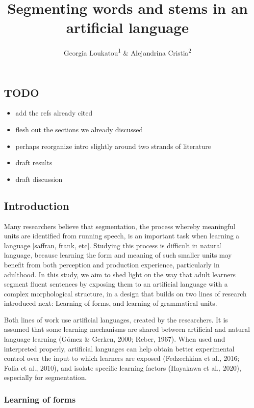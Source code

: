 \documentclass[
  american,
  ,man,floatsintext]{apa6}
\title{Segmenting words and stems in an artificial language}
\author{Georgia Loukatou\textsuperscript{1} \& Alejandrina Cristia\textsuperscript{2}}
\date{}
\affiliation{\vspace{0.5cm}\textsuperscript{1} Stanford University\\\textsuperscript{2} Laboratoire de Sciences Cognitives et de Psycholinguistique, Département d'Etudes Cognitives, ENS, EHESS, CNRS, PSL University}
\providecommand{\tightlist}{%
  \setlength{\itemsep}{0pt}\setlength{\parskip}{0pt}}
\begin{document}
\maketitle

\hypertarget{todo}{%
\subsection{TODO}\label{todo}}

\begin{itemize}
\tightlist
\item
  add the refs already cited
\item
  flesh out the sections we already discussed
\item
  perhaps reorganize intro slightly around two strands of literature
\item
  draft results
\item
  draft discussion
\end{itemize}

\hypertarget{introduction}{%
\subsection{Introduction}\label{introduction}}

Many researchers believe that segmentation, the process whereby meaningful units are identified from running speech, is an important task when learning a language {[}saffran, frank, etc{]}. Studying this process is difficult in natural language, because learning the form and meaning of such smaller units may benefit from both perception and production experience, particularly in adulthood. In this study, we aim to shed light on the way that adult learners segment fluent sentences by exposing them to an artificial language with a complex morphological structure, in a design that builds on two lines of research introduced next: Learning of forms, and learning of grammatical units.

Both lines of work use artificial languages, created by the researchers. It is assumed that some learning mechanisms are shared between artificial and natural language learning (Gómez \& Gerken, 2000; Reber, 1967). When used and interpreted properly, artificial languages can help obtain better experimental control over the input to which learners are exposed (Fedzechkina et al., 2016; Folia et al., 2010), and isolate specific learning factors (Hayakawa et al., 2020), especially for segmentation.

\hypertarget{learning-of-forms}{%
\subsubsection{Learning of forms}\label{learning-of-forms}}
\end{document}
